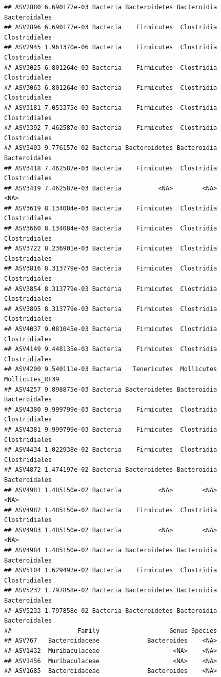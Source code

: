 \documentclass[]{article}
\begin{document}
\begin{verbatim}
## ASV2880 6.690177e-03 Bacteria Bacteroidetes Bacteroidia   Bacteroidales
## ASV2896 6.690177e-03 Bacteria    Firmicutes  Clostridia   Clostridiales
## ASV2945 1.961370e-06 Bacteria    Firmicutes  Clostridia   Clostridiales
## ASV3025 6.801264e-03 Bacteria    Firmicutes  Clostridia   Clostridiales
## ASV3063 6.801264e-03 Bacteria    Firmicutes  Clostridia   Clostridiales
## ASV3181 7.053375e-03 Bacteria    Firmicutes  Clostridia   Clostridiales
## ASV3392 7.462587e-03 Bacteria    Firmicutes  Clostridia   Clostridiales
## ASV3403 9.776157e-02 Bacteria Bacteroidetes Bacteroidia   Bacteroidales
## ASV3418 7.462587e-03 Bacteria    Firmicutes  Clostridia   Clostridiales
## ASV3419 7.462587e-03 Bacteria          <NA>        <NA>            <NA>
## ASV3619 8.134084e-03 Bacteria    Firmicutes  Clostridia   Clostridiales
## ASV3660 8.134084e-03 Bacteria    Firmicutes  Clostridia   Clostridiales
## ASV3722 8.236901e-03 Bacteria    Firmicutes  Clostridia   Clostridiales
## ASV3816 8.313779e-03 Bacteria    Firmicutes  Clostridia   Clostridiales
## ASV3854 8.313779e-03 Bacteria    Firmicutes  Clostridia   Clostridiales
## ASV3895 8.313779e-03 Bacteria    Firmicutes  Clostridia   Clostridiales
## ASV4037 9.081045e-03 Bacteria    Firmicutes  Clostridia   Clostridiales
## ASV4149 9.448135e-03 Bacteria    Firmicutes  Clostridia   Clostridiales
## ASV4200 9.540111e-03 Bacteria   Tenericutes  Mollicutes Mollicutes_RF39
## ASV4257 9.898875e-03 Bacteria Bacteroidetes Bacteroidia   Bacteroidales
## ASV4380 9.999799e-03 Bacteria    Firmicutes  Clostridia   Clostridiales
## ASV4381 9.999799e-03 Bacteria    Firmicutes  Clostridia   Clostridiales
## ASV4434 1.022938e-02 Bacteria    Firmicutes  Clostridia   Clostridiales
## ASV4872 1.474197e-02 Bacteria Bacteroidetes Bacteroidia   Bacteroidales
## ASV4981 1.485150e-02 Bacteria          <NA>        <NA>            <NA>
## ASV4982 1.485150e-02 Bacteria    Firmicutes  Clostridia   Clostridiales
## ASV4983 1.485150e-02 Bacteria          <NA>        <NA>            <NA>
## ASV4984 1.485150e-02 Bacteria Bacteroidetes Bacteroidia   Bacteroidales
## ASV5104 1.629492e-02 Bacteria    Firmicutes  Clostridia   Clostridiales
## ASV5232 1.797858e-02 Bacteria Bacteroidetes Bacteroidia   Bacteroidales
## ASV5233 1.797858e-02 Bacteria Bacteroidetes Bacteroidia   Bacteroidales
##                  Family                   Genus Species
## ASV767   Bacteroidaceae             Bacteroides    <NA>
## ASV1432  Muribaculaceae                    <NA>    <NA>
## ASV1456  Muribaculaceae                    <NA>    <NA>
## ASV1685  Bacteroidaceae             Bacteroides    <NA>

\end{verbatim}
\end{document}
